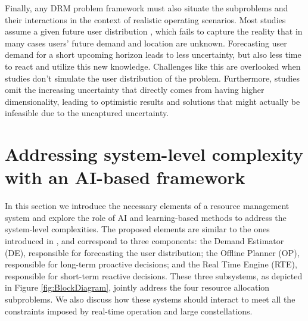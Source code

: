 \documentclass[letterpaper]{article} %
\begin{document}
Finally, any DRM problem framework must also situate the subproblems and their interactions in the context of realistic operating scenarios.  Most studies assume a given future user distribution \cite{Aravanis2015, Cocco2018}, which fails to capture the reality that in many cases users' future demand and location are unknown. Forecasting user demand for a short upcoming horizon leads to less uncertainty, but also less time to react and utilize this new knowledge. Challenges like this are overlooked when studies don't simulate the user distribution of the problem. Furthermore, studies omit the increasing uncertainty that directly comes from having higher dimensionality, leading to optimistic results and solutions that might actually be infeasible due to the uncaptured uncertainty. 






\section{Addressing system-level complexity with an AI-based framework}
\label{sec:4}


In this section we introduce the necessary elements of a resource management system and explore the role of AI and learning-based methods to address the system-level complexities. The proposed elements are similar to the ones introduced in \cite{Guerster2019}, and correspond to three components: the Demand Estimator (DE), responsible for forecasting the user distribution; the Offline Planner (OP), responsible for long-term proactive decisions; and the Real Time Engine (RTE), responsible for short-term reactive decisions. These three subsystems, as depicted in Figure \ref{fig:BlockDiagram}, jointly address the four resource allocation subproblems. We also discuss how these systems should interact to meet all the constraints imposed by real-time operation and large constellations.
\end{document}

